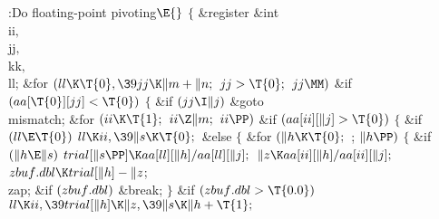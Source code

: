 \Y\B\4:Do floating-point pivoting\X${}\E{}$\6
${}\{{}$\1\6
\&{register} \&{int} \\{ii}${},{}$ \\{jj}${},{}$ \\{kk}${},{}$ \\{ll};\7
\&{for} ${}(\\{ll}\K\T{0},\39\\{jj}\K\|m+\|n;{}$ ${}\\{jj}>\T{0};{}$ ${}\\{jj}%
\MM){}$\1\6
\&{if} ${}(\\{aa}[\T{0}][\\{jj}]<\T{0}){}$\5
${}\{{}$\1\6
\&{if} ${}(\\{jj}\I\|j){}$\1\5
\&{goto} \\{mismatch};\2\6
\&{for} ${}(\\{ii}\K\T{1};{}$ ${}\\{ii}\Z\|m;{}$ ${}\\{ii}\PP){}$\1\6
\&{if} ${}(\\{aa}[\\{ii}][\|j]>\T{0}){}$\5
${}\{{}$\1\6
\&{if} ${}(\\{ll}\E\T{0}){}$\1\5
${}\\{ll}\K\\{ii},\39\|s\K\T{0};{}$\2\6
\&{else}\5
${}\{{}$\1\6
\&{for} ${}(\|h\K\T{0};{}$  ; ${}\|h\PP){}$\5
${}\{{}$\1\6
\&{if} ${}(\|h\E\|s){}$\1\5
${}\\{trial}[\|s\PP]\K\\{aa}[\\{ll}][\|h]/\\{aa}[\\{ll}][\|j];{}$\2\6
${}\|z\K\\{aa}[\\{ii}][\|h]/\\{aa}[\\{ii}][\|j];{}$\6
${}\\{zbuf}.\\{dbl}\K\\{trial}[\|h]-\|z{}$;\5
\\{zap};\6
\&{if} ${}(\\{zbuf}.\\{dbl}){}$\1\5
\&{break};\2\6
\4${}\}{}$\2\6
\&{if} ${}(\\{zbuf}.\\{dbl}>\T{0.0}){}$\1\5
${}\\{ll}\K\\{ii},\39\\{trial}[\|h]\K\|z,\39\|s\K\|h+\T{1};{}$\2\6
